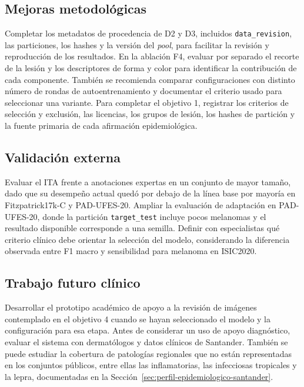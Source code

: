 \subsection{Mejoras metodológicas}

Completar los metadatos de procedencia de D2 y D3, incluidos \texttt{data\_revision}, las particiones, los hashes y la versión del \textit{pool}, para facilitar la revisión y reproducción de los resultados. En la ablación F4, evaluar por separado el recorte de la lesión y los descriptores de forma y color para identificar la contribución de cada componente. También se recomienda comparar configuraciones con distinto número de rondas de autoentrenamiento y documentar el criterio usado para seleccionar una variante. Para completar el objetivo 1, registrar los criterios de selección y exclusión, las licencias, los grupos de lesión, los hashes de partición y la fuente primaria de cada afirmación epidemiológica.

\subsection{Validación externa}

Evaluar el ITA frente a anotaciones expertas en un conjunto de mayor tamaño, dado que su desempeño actual quedó por debajo de la línea base por mayoría en Fitzpatrick17k-C y PAD-UFES-20. Ampliar la evaluación de adaptación en PAD-UFES-20, donde la partición \texttt{target\_test} incluye pocos melanomas y el resultado disponible corresponde a una semilla. Definir con especialistas qué criterio clínico debe orientar la selección del modelo, considerando la diferencia observada entre F1 macro y sensibilidad para melanoma en ISIC2020.

\subsection{Trabajo futuro clínico}

Desarrollar el prototipo académico de apoyo a la revisión de imágenes contemplado en el objetivo 4 cuando se hayan seleccionado el modelo y la configuración para esa etapa. Antes de considerar un uso de apoyo diagnóstico, evaluar el sistema con dermatólogos y datos clínicos de Santander. También se puede estudiar la cobertura de patologías regionales que no están representadas en los conjuntos públicos, entre ellas las inflamatorias, las infecciosas tropicales y la lepra, documentadas en la Sección~\ref{sec:perfil-epidemiologico-santander}.
